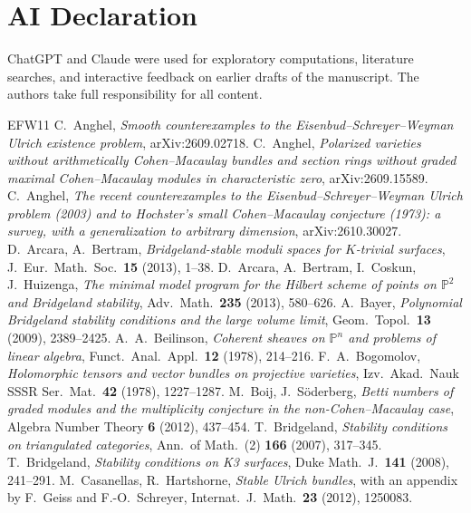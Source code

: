 \documentclass[11pt]{amsart}
\theoremstyle{definition}
\theoremstyle{remark}
\newcommand{\PP}{\mathbb{P}}
\begin{document}
\section*{AI Declaration}
ChatGPT and Claude were used for exploratory computations, literature searches, and interactive feedback on earlier drafts of the manuscript. The authors take full responsibility for all content.

\begin{thebibliography}{EFW11}
 C.~Anghel, \emph{Smooth counterexamples to the Eisenbud--Schreyer--Weyman Ulrich existence problem}, arXiv:2609.02718.
 C.~Anghel, \emph{Polarized varieties without arithmetically Cohen--Macaulay bundles and section rings without graded maximal Cohen--Macaulay modules in characteristic zero}, arXiv:2609.15589.
 C.~Anghel, \emph{The recent counterexamples to the Eisenbud--Schreyer--Weyman Ulrich problem (2003) and to Hochster's small Cohen--Macaulay conjecture (1973): a survey, with a generalization to arbitrary dimension}, arXiv:2610.30027.
 D.~Arcara, A.~Bertram, \emph{Bridgeland-stable moduli spaces for $K$-trivial surfaces}, J.\ Eur.\ Math.\ Soc.\ \textbf{15} (2013), 1--38.
 D.~Arcara, A.~Bertram, I.~Coskun, J.~Huizenga, \emph{The minimal model program for the Hilbert scheme of points on $\PP^2$ and Bridgeland stability}, Adv.\ Math.\ \textbf{235} (2013), 580--626.
 A.~Bayer, \emph{Polynomial Bridgeland stability conditions and the large volume limit}, Geom.\ Topol.\ \textbf{13} (2009), 2389--2425.
 A.~A.~Beilinson, \emph{Coherent sheaves on $\mathbb P^n$ and problems of linear algebra}, Funct.\ Anal.\ Appl.\ \textbf{12} (1978), 214--216.
 F.~A.~Bogomolov, \emph{Holomorphic tensors and vector bundles on projective varieties}, Izv.\ Akad.\ Nauk SSSR Ser.\ Mat.\ \textbf{42} (1978), 1227--1287.
 M.~Boij, J.~Söderberg, \emph{Betti numbers of graded modules and the multiplicity conjecture in the non-Cohen--Macaulay case}, Algebra Number Theory \textbf{6} (2012), 437--454.
 T.~Bridgeland, \emph{Stability conditions on triangulated categories}, Ann.\ of Math.\ (2) \textbf{166} (2007), 317--345.
 T.~Bridgeland, \emph{Stability conditions on K3 surfaces}, Duke Math.\ J.\ \textbf{141} (2008), 241--291.
 M.~Casanellas, R.~Hartshorne, \emph{Stable Ulrich bundles}, with an appendix by F.~Geiss and F.-O.~Schreyer, Internat.\ J.\ Math.\ \textbf{23} (2012), 1250083.

\end{thebibliography}
\end{document}
